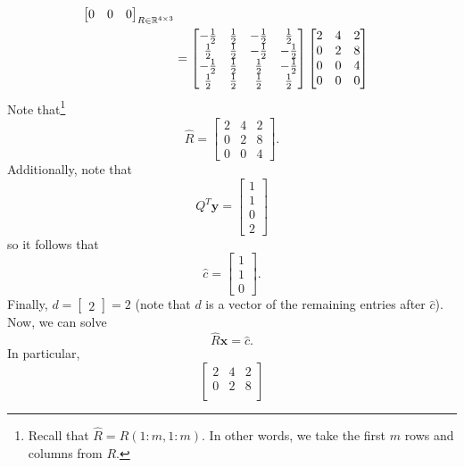 \documentclass[letterpaper]{article}
\newcommand{\0}{\mathbf{0}}
\newcommand{\y}{\mathbf{y}}
\newcommand{\x}{\mathbf{x}}
\begin{document}
\begin{mdframed}
\begin{equation*}
\begin{aligned}
{\begin{bmatrix}
                0 & 0 & 0
            \end{bmatrix}}_{R \in \mathbb{R}^{4 \times 3}} \\ 
                &= \begin{bmatrix}
                    -\frac{1}{2} & \frac{1}{2} & -\frac{1}{2} & \frac{1}{2} \\ 
                    \frac{1}{2} & \frac{1}{2} & -\frac{1}{2} & -\frac{1}{2} \\ 
                    -\frac{1}{2} & \frac{1}{2} & \frac{1}{2} & -\frac{1}{2} \\ 
                    \frac{1}{2} & \frac{1}{2} & \frac{1}{2} & \frac{1}{2}
                \end{bmatrix} \begin{bmatrix}
                    2 & 4 & 2 \\ 
                    0 & 2 & 8 \\ 
                    0 & 0 & 4 \\ 
                    0 & 0 & 0
                \end{bmatrix}
        \end{aligned}
    \end{equation*}
    Note that\footnote{Recall that $\hat{R} = R(1:m, 1:m)$. In other words, we take the first $m$ rows and columns from $R$.} \[\hat{R} = \begin{bmatrix}
        2 & 4 & 2 \\ 
        0 & 2 & 8 \\ 
        0 & 0 & 4
    \end{bmatrix}.\] Additionally, note that \[Q^T \y = \begin{bmatrix}
        1 \\ 1 \\ 0 \\ 2
    \end{bmatrix}\] so it follows that \[\hat{c} = \begin{bmatrix}
        1 \\ 1 \\ 0
    \end{bmatrix}.\] Finally, $d = \begin{bmatrix}
        2
    \end{bmatrix} = 2$ (note that $d$ is a vector of the remaining entries after $\hat{c}$). Now, we can solve \[\hat{R}\x = \hat{c}.\] In particular,
    \[\begin{bmatrix}
        2 & 4 & 2 \\ 
        0 & 2 & 8 \\ 

\end{bmatrix}\]
\end{mdframed}
\end{document}
